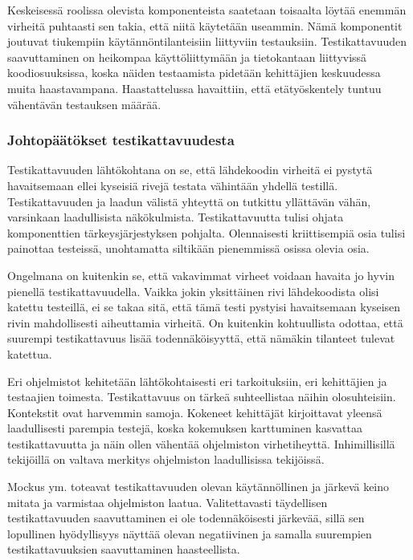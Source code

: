 \documentclass[finnish]{../tktltiki2}
\theoremstyle{definition}
\theoremstyle{remark}
\begin{document}
    Keskeisessä roolissa olevista komponenteista saatetaan toisaalta löytää enemmän virheitä puhtaasti sen takia, että 
niitä käytetään useammin. Nämä komponentit joutuvat tiukempiin käytännöntilanteisiin liittyviin testauksiin. 
Testikattavuuden saavuttaminen on heikompaa käyttöliittymään ja tietokantaan liittyvissä koodiosuuksissa, koska näiden 
testaamista pidetään kehittäjien keskuudessa muita haastavampana. Haastattelussa havaittiin, että etätyöskentely tuntuu 
vähentävän testauksen määrää.

\subsubsection{Johtopäätökset testikattavuudesta}

Testikattavuuden lähtökohtana on se, että lähdekoodin virheitä ei pystytä havaitsemaan ellei kyseisiä rivejä testata 
vähintään yhdellä testillä. Testikattavuuden ja laadun välistä yhteyttä on tutkittu yllättävän vähän, varsinkaan 
laadullisista näkökulmista. Testikattavuutta tulisi ohjata komponenttien tärkeysjärjestyksen pohjalta. Olennaisesti 
kriittisempiä osia tulisi painottaa testeissä, unohtamatta siltikään pienemmissä osissa olevia osia.

    Ongelmana on kuitenkin se, että vakavimmat virheet voidaan havaita jo hyvin pienellä testikattavuudella. Vaikka 
jokin yksittäinen rivi lähdekoodista olisi katettu testeillä, ei se takaa sitä, että tämä testi pystyisi havaitsemaan 
kyseisen rivin mahdollisesti aiheuttamia virheitä. On kuitenkin kohtuullista odottaa, että suurempi testikattavuus 
lisää todennäköisyyttä, että nämäkin tilanteet tulevat katettua.

    Eri ohjelmistot kehitetään lähtökohtaisesti eri tarkoituksiin, eri kehittäjien ja testaajien toimesta. 
Testikattavuus on tärkeä suhteellistaa näihin olosuhteisiin. Kontekstit ovat harvemmin samoja. Kokeneet kehittäjät 
kirjoittavat yleensä laadullisesti parempia testejä, koska kokemuksen karttuminen kasvattaa testikattavuutta ja näin 
ollen vähentää ohjelmiston virhetiheyttä. Inhimillisillä tekijöillä on valtava merkitys ohjelmiston laadullisissa 
tekijöissä.

    Mockus ym. toteavat testikattavuuden olevan käytännöllinen ja järkevä keino mitata ja varmistaa ohjelmiston laatua. 
Valitettavasti täydellisen testikattavuuden saavuttaminen ei ole todennäköisesti järkevää, sillä sen lopullinen 
hyödyllisyys näyttää olevan negatiivinen ja samalla suurempien testikattavuuksien saavuttaminen 
haasteellista.\newline
\end{document}
